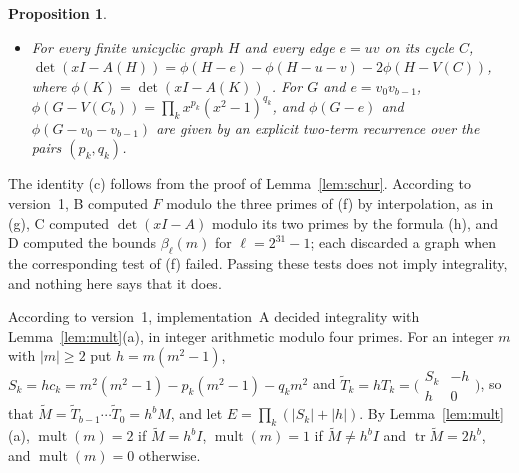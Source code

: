 \documentclass[11pt]{article}
\newtheorem{proposition}[lemma]{Proposition}
\theoremstyle{definition}
\theoremstyle{remark}
\DeclareMathOperator{\mult}{mult}
\DeclareMathOperator{\tr}{tr}
\newcommand{\Z}{\mathbb Z}
\begin{document}
\begin{proposition}
\begin{itemize}
 recover every polynomial of degree at most $d$ over $\Z/\ell$ from its values.
 For $\ell\in\{10^9+7,998244353,2^{61}-1\}$ and $3\le b\le49$, the
 determinants of the matrix defining $F$, evaluated modulo $\ell$ at these
 nodes, are the values of $F$ modulo $\ell$, and the reconstruction of degree
 $4b$ is $F$ modulo $\ell$.
\item[(h)] For every finite unicyclic graph $H$ and every edge $e=uv$ on its
 cycle $C$, $\det(xI-A(H))=\phi(H-e)-\phi(H-u-v)-2\phi(H-V(C))$, where
 $\phi(K)=\det(xI-A(K))$~\cite{sch}. For $G$ and $e=v_0v_{b-1}$,
 $\phi(G-V(C_b))=\prod_kx^{p_k}(x^2-1)^{q_k}$, and $\phi(G-e)$ and
 $\phi(G-v_0-v_{b-1})$ are given by an explicit two-term recurrence over the
 pairs $(p_k,q_k)$.
\end{itemize}
\end{proposition}

The identity (c) follows from the proof of Lemma~\ref{lem:schur}. According
to version~1, B computed $F$ modulo the three primes of (f) by interpolation, as
in (g), C computed $\det(xI-A)$ modulo its two primes by the formula (h), and D
computed the bounds $\beta_\ell(m)$ for $\ell=2^{31}-1$; each discarded a graph
when the corresponding test of (f) failed. Passing these tests does not imply
integrality, and nothing here says that it does.

According to version~1, implementation~A decided integrality with
Lemma~\ref{lem:mult}(a), in integer arithmetic modulo four primes. For an integer $m$ with $|m|\ge2$ put
$h=m(m^2-1)$, $S_k=hc_k=m^2(m^2-1)-p_k(m^2-1)-q_km^2$ and
$\tilde T_k=hT_k=\bigl(\begin{smallmatrix}S_k&-h\\h&0\end{smallmatrix}\bigr)$,
so that $\tilde M=\tilde T_{b-1}\cdots\tilde T_0=h^bM$, and let
$E=\prod_k(|S_k|+|h|)$. By Lemma~\ref{lem:mult}(a), $\mult(m)=2$ if
$\tilde M=h^bI$, $\mult(m)=1$ if $\tilde M\ne h^bI$ and $\tr\tilde M=2h^b$, and
$\mult(m)=0$ otherwise.
\end{document}
